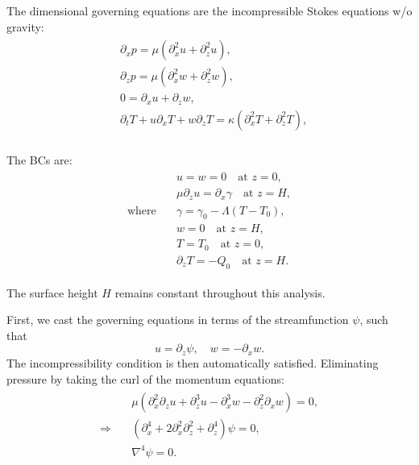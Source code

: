\documentclass{article}
\begin{document}
The dimensional governing equations are the incompressible Stokes equations w/o gravity:
\begin{align}\label{eq:marangoni_convect_gov_eqns_dim_1}
 \begin{split}
  &\partial_{x}p = \mu (\partial^{2}_{x}u +\partial^{2}_{z}u),\\
  &\partial_{z}p = \mu (\partial^{2}_{x}w +\partial^{2}_{z}w),\\
  & 0 = \partial_{x}u + \partial_{z} w, \\
  & \partial_{t}T + u \partial_{x}T + w \partial_{z} T = \kappa (\partial^{2}_{x}T +\partial^{2}_{z}T),\\
 \end{split}
\end{align}

The BCs are:
\begin{align}
\label{eq:marangoni_convect_bcs_dim_1}
 \begin{split}
  & u = w = 0 \quad \textrm{at } z = 0,\\
  & \mu \partial_{z}u = \partial_{x}\gamma \quad \textrm{at } z = H,\\
  \textrm{where}\quad & \gamma = \gamma_{0}-\Lambda(T-T_{0}),\\
  & w = 0 \quad \textrm{at } z = H, \\
  & T=T_{0} \quad \textrm{at } z = 0, \\
  & \partial_{z}T = -Q_{0} \quad \textrm{at } z = H.
 \end{split}
\end{align}

The surface height $H$ remains constant throughout this analysis. 

First, we cast the governing equations in terms of the streamfunction $\psi$, such that 
\begin{equation}\label{eq:streamfunction_def}
 u = \partial_{z}\psi,\quad w = -\partial_{x}w.
\end{equation}
The incompressibility condition is then automatically satisfied. Eliminating pressure  by taking the curl of the momentum equations:
\begin{align}
 \begin{split}
  & \mu(\partial^{2}_{x} \partial_{z} u + \partial^{3}_{z} u - \partial^{3}_{x}  w - \partial^{2}_{z}\partial_{x} w)  = 0,\\
  \Rightarrow \quad & (\partial^{4}_{x} + 2\partial^{2}_{x}\partial^{2}_{z} + \partial^{4}_{z})\psi = 0,\\
  & \boxed{\nabla^{4}\psi = 0}.
 \end{split}
\end{align}
\end{document}
